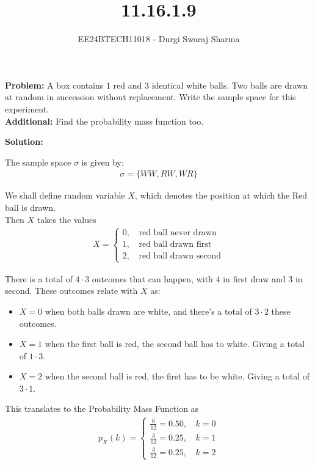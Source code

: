 \documentclass{beamer}
\title{11.16.1.9}
\author{EE24BTECH11018 - Durgi Swaraj Sharma}
\providecommand{\brak}[1]{\ensuremath{\left(#1\right)}}
\numberwithin{equation}{section}
\begin{document}
\begin{frame}
\textbf{Problem:} A box contains $1$ red and $3$ identical white balls. Two balls are drawn at random in succession without replacement. Write the sample space for this experiment.\\
\textbf{Additional:} Find the probability mass function too.
\end{frame}

\begin{frame}
\textbf{Solution:}

The sample space $\sigma$ is given by:
\begin{align}
  \sigma = \{WW, RW, WR\}
\end{align}

We shall define random variable $X$, which denotes the position at which the Red ball is drawn. \\
Then $X$ takes the values
\begin{align}
  X = 
  \begin{cases}
    0 ,&\, \text{red ball never drawn}\\
    1 ,&\, \text{red ball drawn first}\\
    2 ,&\, \text{red ball drawn second}
  \end{cases}
\end{align}
\end{frame}

\begin{frame}
There is a total of $4\cdot3$ outcomes that can happen, with $4$ in first draw and $3$ in second.
These outcomes relate with $X$ as:
\begin{itemize}
  \item $X=0$ when both balls drawn are white, and there's a total of $3\cdot2$ these outcomes.
  \item $X=1$ when the first ball is red, the second ball has to white. Giving a total of $1\cdot3$.
  \item $X=2$ when the second ball is red, the first has to be white. Giving a total of $3\cdot1$.
\end{itemize}
\end{frame}

\begin{frame}
This translates to the Probability Mass Function as 
\begin{align}
  p_X\brak{k} = 
  \begin{cases}
    \frac{6}{12} = 0.50,\,& k = 0\\
    \frac{3}{12} = 0.25,\,& k = 1\\
    \frac{3}{12} = 0.25,\,& k = 2
  \end{cases}
\end{align}
\end{frame}
\end{document}
